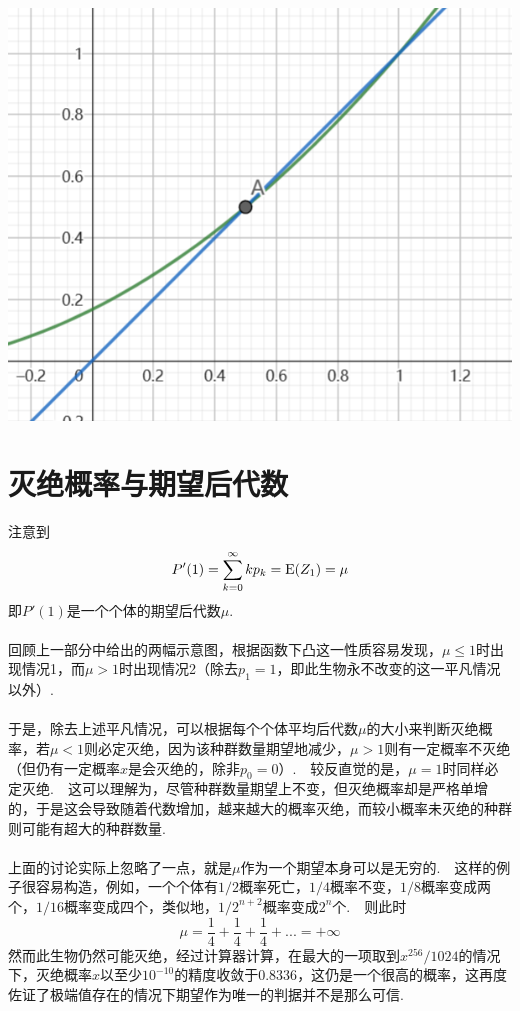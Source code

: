 \documentclass{article}
\begin{document}
\begin{CJK}{UTF8}{gbsn}
\begin{minipage}{0.5\textwidth}
    \includegraphics[scale=0.7]{case2.png}
\end{minipage}
\section{灭绝概率与期望后代数}
注意到
$$ P'(1)=\sum\limits_{k=0}^{\infty}kp_{k}={\rm E}(Z_1)=\mu $$
即$P'(1)$是一个个体的期望后代数$\mu$.
\\\\
回顾上一部分中给出的两幅示意图，根据函数下凸这一性质容易发现，$\mu\leq 1$时出现情况1，而$\mu>1$时出现情况2（除去$p_1=1$，即此生物永不改变的这一平凡情况以外）.
\\\\
于是，除去上述平凡情况，可以根据每个个体平均后代数$\mu$的大小来判断灭绝概率，若$\mu<1$则必定灭绝，因为该种群数量期望地减少，$\mu>1$则有一定概率不灭绝（但仍有一定概率$x$是会灭绝的，除非$p_0=0$）.\ \ 较反直觉的是，$\mu=1$时同样必定灭绝.\ \ 这可以理解为，尽管种群数量期望上不变，但灭绝概率却是严格单增的，于是这会导致随着代数增加，越来越大的概率灭绝，而较小概率未灭绝的种群则可能有超大的种群数量.
\\\\
上面的讨论实际上忽略了一点，就是$\mu$作为一个期望本身可以是无穷的.\ \ 这样的例子很容易构造，例如，一个个体有$1/2$概率死亡，$1/4$概率不变，$1/8$概率变成两个，$1/16$概率变成四个，类似地，$1/2^{n+2}$概率变成$2^n$个.\ \ 则此时
$$ \mu=\frac{1}{4}+\frac{1}{4}+\frac{1}{4}+...=+\infty $$
然而此生物仍然可能灭绝，经过计算器计算，在最大的一项取到$x^{256}/1024$的情况下，灭绝概率$x$以至少$10^{-10}$的精度收敛于$0.8336$，这仍是一个很高的概率，这再度佐证了极端值存在的情况下期望作为唯一的判据并不是那么可信.

\end{CJK}
\end{document}
